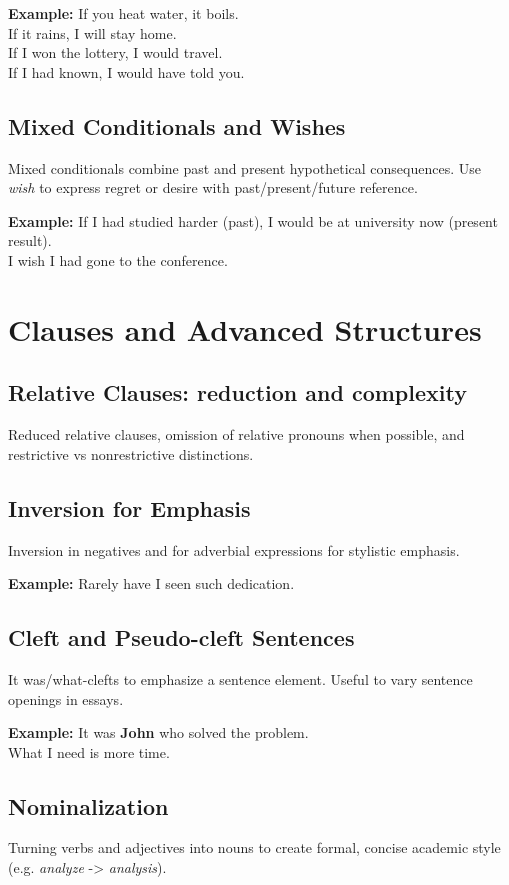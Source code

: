 \documentclass[12pt,oneside]{book}
\newcommand{\ex}[1]{\begin{examplebox}\textbf{Example:} #1\end{examplebox}}
\begin{document}
\ex{If you heat water, it boils. \\ If it rains, I will stay home. \\ If I won the lottery, I would travel. \\ If I had known, I would have told you.}

\section{Mixed Conditionals and Wishes}
Mixed conditionals combine past and present hypothetical consequences. Use \textit{wish} to express regret or desire with past/present/future reference.

\ex{If I had studied harder (past), I would be at university now (present result). \\ I wish I had gone to the conference.}

\chapter{Clauses and Advanced Structures}
\section{Relative Clauses: reduction and complexity}
Reduced relative clauses, omission of relative pronouns when possible, and restrictive vs nonrestrictive distinctions.

\section{Inversion for Emphasis}
Inversion in negatives and for adverbial expressions for stylistic emphasis.

\ex{Rarely have I seen such dedication.}

\section{Cleft and Pseudo-cleft Sentences}
It was/what-clefts to emphasize a sentence element. Useful to vary sentence openings in essays.

\ex{It was \textbf{John} who solved the problem. \\ What I need is more time.}

\section{Nominalization}
Turning verbs and adjectives into nouns to create formal, concise academic style (e.g. \textit{analyze} -> \textit{analysis}).
\end{document}
